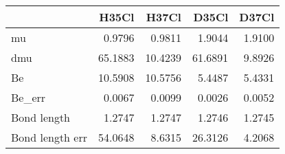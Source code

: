 \begin{tabular}{lrrrr}
\toprule
{} &   H35Cl &   H37Cl &   D35Cl &  D37Cl \\
\midrule
mu              &  0.9796 &  0.9811 &  1.9044 & 1.9100 \\
dmu             & 65.1883 & 10.4239 & 61.6891 & 9.8926 \\
Be              & 10.5908 & 10.5756 &  5.4487 & 5.4331 \\
Be\_err          &  0.0067 &  0.0099 &  0.0026 & 0.0052 \\
Bond length     &  1.2747 &  1.2747 &  1.2746 & 1.2745 \\
Bond length err & 54.0648 &  8.6315 & 26.3126 & 4.2068 \\
\bottomrule
\end{tabular}
